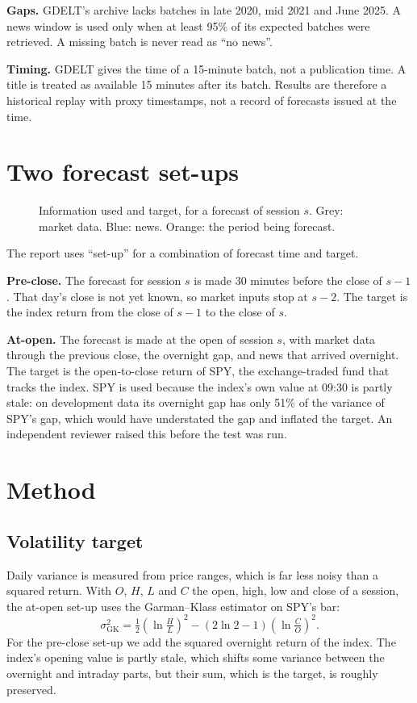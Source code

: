 \documentclass[11pt,a4paper]{article}
\begin{document}
\textbf{Gaps.} GDELT's archive lacks batches in late 2020, mid 2021 and June 2025. A news window
is used only when at least 95\% of its expected batches were retrieved. A missing batch is never
read as ``no news''.

\textbf{Timing.} GDELT gives the time of a 15-minute batch, not a publication time. A title is
treated as available 15 minutes after its batch. Results are therefore a historical replay with
proxy timestamps, not a record of forecasts issued at the time.

\section{Two forecast set-ups}

\begin{figure}[h]
\centering
\timingdiagram
\caption{Information used and target, for a forecast of session $s$. Grey: market data. Blue:
news. Orange: the period being forecast.}
\end{figure}

The report uses ``set-up'' for a combination of forecast time and target.

\textbf{Pre-close.} The forecast for session $s$ is made 30 minutes before the close of
$s{-}1$. That day's close is not yet known, so market inputs stop at $s{-}2$. The target is the
index return from the close of $s{-}1$ to the close of $s$.

\textbf{At-open.} The forecast is made at the open of session $s$, with market data through the
previous close, the overnight gap, and news that arrived overnight. The target is the
open-to-close return of SPY, the exchange-traded fund that tracks the index. SPY is used
because the index's own value at 09:30 is partly stale: on development data its overnight gap
has only 51\% of the variance of SPY's gap, which would have understated the gap and inflated
the target. An independent reviewer raised this before the test was run.

\section{Method}

\subsection{Volatility target}
Daily variance is measured from price ranges, which is far less noisy than a squared return.
With $O$, $H$, $L$ and $C$ the open, high, low and close of a session, the at-open set-up uses
the Garman--Klass estimator on SPY's bar:
\[
\sigma^2_{\mathrm{GK}} = \tfrac12\left(\ln\tfrac{H}{L}\right)^2-(2\ln 2-1)\left(\ln\tfrac{C}{O}\right)^2 .
\]
For the pre-close set-up we add the squared overnight return of the index. The index's opening
value is partly stale, which shifts some variance between the overnight and intraday parts,
but their sum, which is the target, is roughly preserved.
\end{document}
